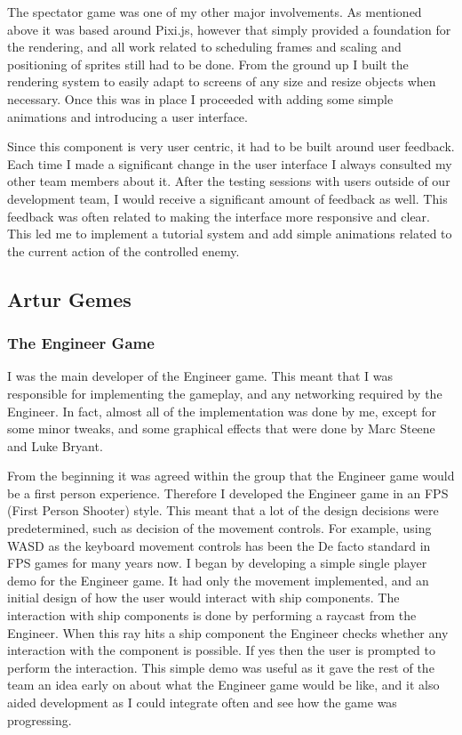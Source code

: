 \documentclass[a4paper,11pt]{article}
\begin{document}
The spectator game was one of my other major involvements. As mentioned above it was based around Pixi.js, however that simply provided a foundation for the rendering, and all work related to scheduling frames and scaling and positioning of sprites still had to be done. From the ground up I built the rendering system to easily adapt to screens of any size and resize objects when necessary. Once this was in place I proceeded with adding some simple animations and introducing a user interface.

Since this component is very user centric, it had to be built around user feedback. Each time I made a significant change in the user interface I always consulted my other team members about it. After the testing sessions with users outside of our development team, I would receive a significant amount of feedback as well. This feedback was often related to making the interface more responsive and clear. This led me to implement a tutorial system and add simple animations related to the current action of the controlled enemy.

\clearpage

\subsection{Artur Gemes}

\subsubsection{The Engineer Game}

I was the main developer of the Engineer game. This meant that I was responsible for implementing the gameplay, and any networking required by the Engineer. In fact, almost all of the implementation was done by me, except for some minor tweaks, and some graphical effects that were done by Marc Steene and Luke Bryant.

From the beginning it was agreed within the group that the Engineer game would be a first person experience. Therefore I developed the Engineer game in an FPS (First Person Shooter) style. This meant that a lot of the design decisions were predetermined, such as decision of the movement controls. For example, using WASD as the keyboard movement controls has been the De facto standard in FPS games for many years now. I began by developing a simple single player demo for the Engineer game. It had only the movement implemented, and an initial design of how the user would interact with ship components. The interaction with ship components is done by performing a raycast from the Engineer. When this ray hits a ship component the Engineer checks whether any interaction with the component is possible. If yes then the user is prompted to perform the interaction. This simple demo was useful as it gave the rest of the team an idea early on about what the Engineer game would be like, and it also aided development as I could integrate often and see how the game was progressing.
\end{document}
